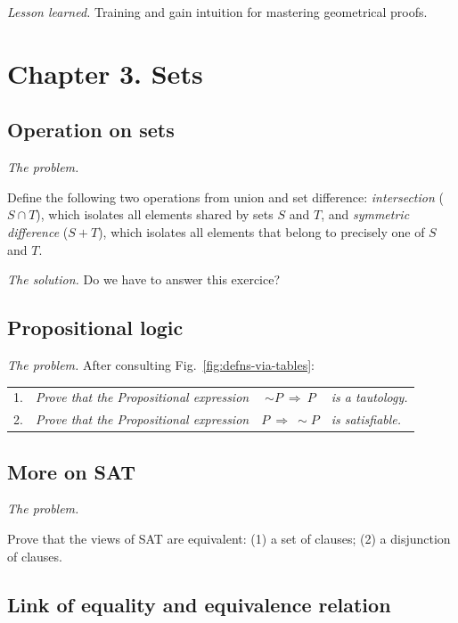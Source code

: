 \noindent \textit{Lesson learned.}
Training and gain intuition for mastering geometrical proofs. 




\section{Chapter 3. Sets}

\subsection{Operation on sets}

\noindent \textit{The problem.}

Define the following two operations from union and set
difference: {\it intersection} ($S \cap T$), which isolates all
elements shared by sets $S$ and $T$, and {\it symmetric difference}
($S+T$), which isolates all elements that belong to precisely one of
$S$ and $T$.
\medskip

\noindent \textit{The solution.}
{\Denis Do we have to answer this exercice?}

\subsection{Propositional logic}

\noindent \textit{The problem.}
After consulting Fig.~\ref{fig:defns-via-tables}:

\begin{tabular}{llcl}
1. &
{\it Prove that the Propositional expression} &
$\sim P \ \Rightarrow \ P$ &
{\it is a tautology.} \\
2. &
{\it Prove that the Propositional expression} &
$P \ \Rightarrow \ \sim P$ &
{\it is satisfiable.}
\end{tabular}

\subsection{More on SAT}

\noindent \textit{The problem.}

Prove that the views of SAT are equivalent: (1) a set of clauses; (2)
a disjunction of clauses.

\subsection{Link of equality and equivalence relation}

